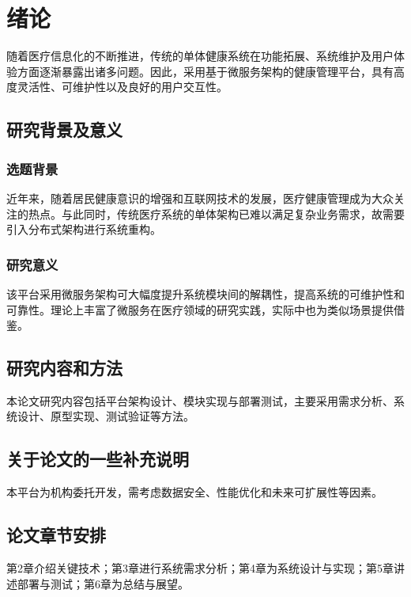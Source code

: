 \section{绪论}

随着医疗信息化的不断推进，传统的单体健康系统在功能拓展、系统维护及用户体验方面逐渐暴露出诸多问题。因此，采用基于微服务架构的健康管理平台，具有高度灵活性、可维护性以及良好的用户交互性。

\subsection{研究背景及意义}
\subsubsection{选题背景}
近年来，随着居民健康意识的增强和互联网技术的发展，医疗健康管理成为大众关注的热点。与此同时，传统医疗系统的单体架构已难以满足复杂业务需求，故需要引入分布式架构进行系统重构。

\subsubsection{研究意义}
该平台采用微服务架构可大幅度提升系统模块间的解耦性，提高系统的可维护性和可靠性。理论上丰富了微服务在医疗领域的研究实践，实际中也为类似场景提供借鉴。

\subsection{研究内容和方法}
本论文研究内容包括平台架构设计、模块实现与部署测试，主要采用需求分析、系统设计、原型实现、测试验证等方法。

\subsection{关于论文的一些补充说明}
本平台为机构委托开发，需考虑数据安全、性能优化和未来可扩展性等因素。

\subsection{论文章节安排}
第2章介绍关键技术；第3章进行系统需求分析；第4章为系统设计与实现；第5章讲述部署与测试；第6章为总结与展望。
